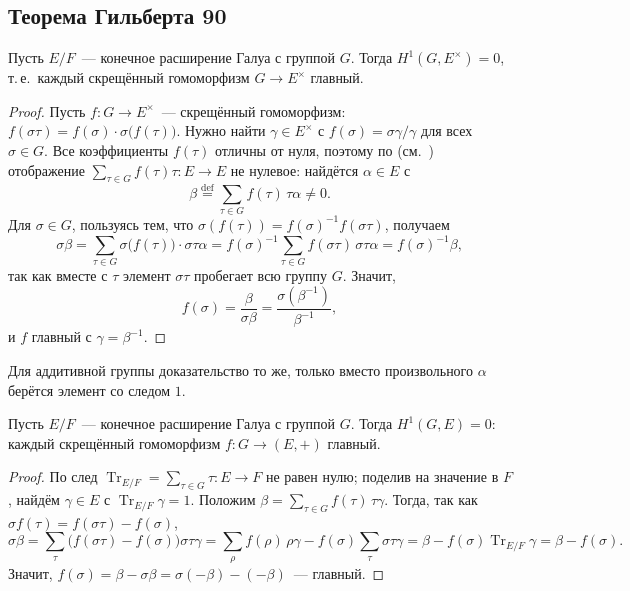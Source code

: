 \subsection*{Теорема Гильберта 90}

\begin{theorem}[5.23]
Пусть $E/F$~--- конечное расширение Галуа с группой $G$. Тогда $H^1(G,E^\times)=0$, т.\,е.\ каждый скрещённый
гомоморфизм $G\to E^\times$ главный.
\end{theorem}

\begin{proof}
Пусть $f\colon G\to E^\times$~--- скрещённый гомоморфизм: $f(\sigma\tau)=f(\sigma)\cdot\sigma\bigl(f(\tau)\bigr)$. Нужно
найти $\gamma\in E^\times$ с $f(\sigma)=\sigma\gamma/\gamma$ для всех $\sigma\in G$. Все коэффициенты $f(\tau)$ отличны
от нуля, поэтому по  (см.~) отображение $\sum_{\tau\in G}f(\tau)\tau\colon E\to E$ не нулевое: найдётся
$\alpha\in E$ с
\[
\beta\overset{\text{def}}=\sum_{\tau\in G}f(\tau)\,\tau\alpha\ne0.
\]
Для $\sigma\in G$, пользуясь тем, что $\sigma(f(\tau))=f(\sigma)^{-1}f(\sigma\tau)$, получаем
\[
\sigma\beta=\sum_{\tau\in G}\sigma\bigl(f(\tau)\bigr)\cdot\sigma\tau\alpha
=f(\sigma)^{-1}\sum_{\tau\in G}f(\sigma\tau)\,\sigma\tau\alpha=f(\sigma)^{-1}\beta,
\]
так как вместе с $\tau$ элемент $\sigma\tau$ пробегает всю группу $G$. Значит,
\[
f(\sigma)=\frac{\beta}{\sigma\beta}=\frac{\sigma(\beta^{-1})}{\beta^{-1}},
\]
и $f$ главный с $\gamma=\beta^{-1}$.
\end{proof}

Для аддитивной группы доказательство то же, только вместо произвольного $\alpha$ берётся элемент со следом $1$.

\begin{theorem}
Пусть $E/F$~--- конечное расширение Галуа с группой $G$. Тогда $H^1(G,E)=0$: каждый скрещённый гомоморфизм
$f\colon G\to(E,+)$ главный.
\end{theorem}

\begin{proof}
По  след $\operatorname{Tr}_{E/F}=\sum_{\tau\in G}\tau\colon E\to F$ не равен нулю; поделив на значение в $F$,
найдём $\gamma\in E$ с $\operatorname{Tr}_{E/F}\gamma=1$. Положим $\beta=\sum_{\tau\in G}f(\tau)\,\tau\gamma$. Тогда, так
как $\sigma f(\tau)=f(\sigma\tau)-f(\sigma)$,
\[
\sigma\beta=\sum_\tau\bigl(f(\sigma\tau)-f(\sigma)\bigr)\sigma\tau\gamma=\sum_\rho f(\rho)\,\rho\gamma-f(\sigma)\sum_\tau\sigma\tau\gamma
=\beta-f(\sigma)\operatorname{Tr}_{E/F}\gamma=\beta-f(\sigma).
\]
Значит, $f(\sigma)=\beta-\sigma\beta=\sigma(-\beta)-(-\beta)$~--- главный.
\end{proof}


